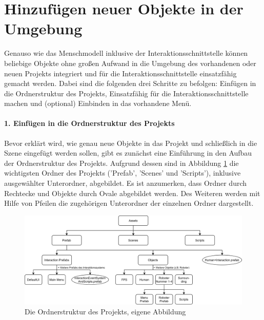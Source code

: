 \section{Hinzufügen neuer Objekte in der Umgebung}\label{sec:ObjekteEinbinden}
Genauso wie das Menschmodell inklusive der Interaktionsschnittstelle können beliebige Objekte ohne großen Aufwand in die Umgebung des vorhandenen oder neuen Projekts integriert und für die Interaktionsschnittstelle einsatzfähig gemacht werden. Dabei sind die folgenden drei Schritte zu befolgen: Einfügen in die Ordnerstruktur des Projekts, Einsatzfähig für die Interaktionsschnittstelle machen und (optional) Einbinden in das vorhandene Menü.

\paragraph{1. Einfügen in die Ordnerstruktur des Projekts}
\noindent Bevor erklärt wird, wie genau neue Objekte in das Projekt und schließlich in die Szene eingefügt werden sollen, gibt es zunächst eine Einführung in den Aufbau der Ordnerstruktur des Projekts. Aufgrund dessen sind in Abbildung \ref{fig:Ordnerstruktur} die wichtigsten Ordner des Projekts ('Prefab', 'Scenes' und 'Scripts'), inklusive ausgewählter Unterordner, abgebildet. Es ist anzumerken, dass Ordner durch Rechtecke und Objekte durch Ovale abgebildet werden. Des Weiteren werden mit Hilfe von Pfeilen die zugehörigen Unterordner der einzelnen Ordner dargestellt.
\begin{figure}[h]
	\centering
	\includegraphics[width=1\linewidth]{Bilder/A54_Ordnerstruktur}
	\caption{Die Ordnerstruktur des Projekts, eigene Abbildung}
	\label{fig:Ordnerstruktur}
\end{figure}
\newline
